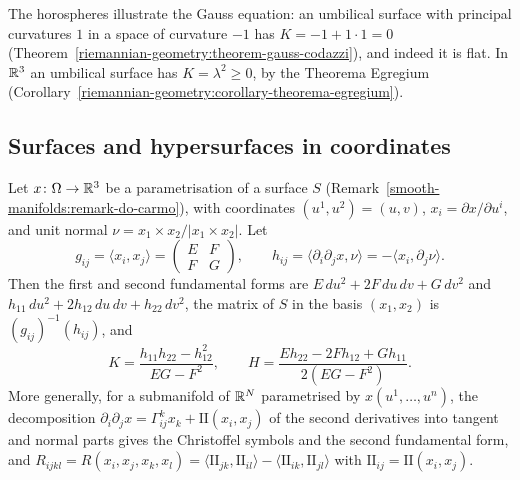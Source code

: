 The horospheres illustrate the Gauss equation: an umbilical surface with principal curvatures $1$ in a space of curvature $-1$ has $K = -1 + 1 \cdot 1 = 0$ (Theorem~\ref{riemannian-geometry:theorem-gauss-codazzi}),
and indeed it is flat. In $\mathbb{R}^3$ an umbilical surface has $K = \lambda^2 \geq 0$, by the Theorema Egregium (Corollary~\ref{riemannian-geometry:corollary-theorema-egregium}).

\subsection{Surfaces and hypersurfaces in coordinates}\label{riemannian-geometry:subsection-coordinates-second-fundamental-form}

\begin{proposition}\label{riemannian-geometry:proposition-surface-coordinates}
Let $x \colon \Omega \to \mathbb{R}^3$ be a parametrisation of a surface $S$ (Remark~\ref{smooth-manifolds:remark-do-carmo}), with coordinates $(u^1, u^2) = (u, v)$,
$x_i = \partial x/\partial u^i$, and unit normal $\nu = x_1 \times x_2/|x_1 \times x_2|$. Let
\[
g_{ij} = \langle x_i, x_j\rangle = \begin{pmatrix} E & F\\ F & G\end{pmatrix}, \qquad h_{ij} = \langle\partial_i\partial_jx, \nu\rangle = -\langle x_i, \partial_j\nu\rangle.
\]
Then the first and second fundamental forms are $E\,du^2 + 2F\,du\,dv + G\,dv^2$ and $h_{11}\,du^2 + 2h_{12}\,du\,dv + h_{22}\,dv^2$, the matrix of $S$ in the basis
$(x_1, x_2)$ is $(g_{ij})^{-1}(h_{ij})$, and
\[
K = \frac{h_{11}h_{22} - h_{12}^2}{EG - F^2}, \qquad H = \frac{Eh_{22} - 2Fh_{12} + Gh_{11}}{2(EG - F^2)}.
\]
More generally, for a submanifold of $\mathbb{R}^N$ parametrised by $x(u^1, \ldots, u^n)$, the decomposition
$\partial_i\partial_jx = \Gamma^k_{ij}x_k + \mathrm{II}(x_i, x_j)$ of the second derivatives into tangent and normal parts gives the Christoffel symbols and the second
fundamental form, and $R_{ijkl} = R(x_i, x_j, x_k, x_l) = \langle\mathrm{II}_{jk}, \mathrm{II}_{il}\rangle - \langle\mathrm{II}_{ik}, \mathrm{II}_{jl}\rangle$ with
$\mathrm{II}_{ij} = \mathrm{II}(x_i, x_j)$.
\end{proposition}


